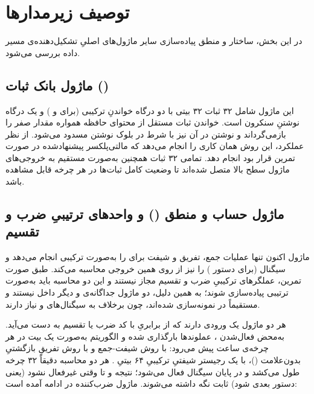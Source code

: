 \section{توصیف زیرمدارها}
در این بخش، ساختار و منطق پیاده‌سازی سایر ماژول‌های اصلیِ تشکیل‌دهنده‌ی مسیر داده بررسی می‌شود.

\subsection{ماژول بانک ثبات ()}
این ماژول شامل ۳۲ ثبات ۳۲ بیتی با دو درگاه خواندنِ ترکیبی (برای  و ) و یک درگاه نوشتنِ سنکرون است. خواندن ثبات  مستقل از محتوای حافظه همواره مقدار صفر را بازمی‌گرداند و نوشتن در آن نیز با شرط  در بلوک نوشتن مسدود می‌شود. از نظر عملکرد، این روش همان کاری را انجام می‌دهد که مالتی‌پلکسر پیشنهادشده در صورت تمرین قرار بود انجام دهد. تمامی ۳۲ ثبات همچنین به‌صورت مستقیم به خروجی‌های ماژول سطح بالا متصل شده‌اند تا وضعیت کامل ثبات‌ها در هر چرخه قابل مشاهده باشد.

\subsection{ماژول حساب و منطق () و واحدهای ترتیبیِ ضرب و تقسیم}
ماژول  اکنون تنها عملیات جمع، تفریق و شیفت برای  را به‌صورت ترکیبی انجام می‌دهد و سیگنال  (برای دستور ) را نیز از روی همین خروجی محاسبه می‌کند. طبق صورت تمرین، عملگرهای ترکیبیِ ضرب و تقسیم مجاز نیستند و این دو محاسبه باید به‌صورت ترتیبی پیاده‌سازی شوند؛ به همین دلیل، دو ماژول جداگانه‌ی  و  دیگر داخل  نیستند و مستقیماً در  نمونه‌سازی شده‌اند، چون برخلاف  به سیگنال‌های  و  نیاز دارند.

هر دو ماژول یک ورودی  دارند که از برابریِ  با کد ضرب یا تقسیم به دست می‌آید. به‌محض فعال‌شدن ، عملوندها بارگذاری شده و الگوریتم به‌صورت یک بیت در هر چرخه‌ی ساعت پیش می‌رود:  با روش شیفت-جمع و  با روش تفریقِ بازگشتیِ بدون‌علامت ()، با یک رجیستر شیفتیِ ترکیبیِ ۶۴ بیتیِ . هر دو محاسبه دقیقاً ۳۲ چرخه طول می‌کشد و در پایان سیگنال  فعال می‌شود؛ نتیجه و  تا وقتی  غیرفعال نشود (یعنی دستور بعدی  شود) ثابت نگه داشته می‌شوند. ماژول ضرب‌کننده در ادامه آمده است:

